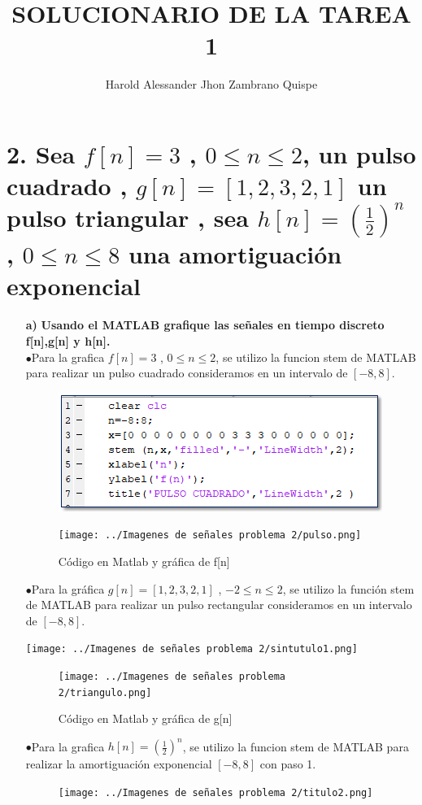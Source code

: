 \documentclass[11pt,a4paper]{article}
\author{Harold Alessander Jhon Zambrano Quispe}
\title{SOLUCIONARIO DE LA TAREA 1}
\begin{document}
   
	\section{{\large \textbf{2. Sea $f[n]=3$ , $0\leq n \leq 2$, un pulso cuadrado , $g[n]=[1,2,3,2,1]$ un pulso triangular , sea $h[n]=(\frac{1}{2})^n$ , $0\leq n\leq 8$ una amortiguación exponencial}}}{
	\large{
	\begin{enumerate}
	\item[\textbf{a)}]
	\textbf{Usando el MATLAB grafique las señales en tiempo discreto f[n],g[n] y h[n].}\\
	$ \bullet$Para la grafica $f[n]=3$ , $ 0\leq n\leq 2$, se utilizo la funcion stem de MATLAB para realizar un pulso cuadrado consideramos en un intervalo de $[-8,8]$.
\begin{figure}[h]
\centering
\includegraphics[scale=0.6]{../Imagenes de señales problema 2/Sin título.png} 
\end{figure}

\begin{figure}[h]
\centering
\texttt{[image: ../Imagenes de señales problema 2/pulso.png]} 
\caption{Código en Matlab y gráfica de f[n]} 
\label{Gráfica_fn}
\end{figure}
$\bullet$Para la gráfica $g[n]=[1,2,3,2,1]$ , $-2\leq n\leq 2$, se utilizo la función stem de MATLAB para realizar un pulso rectangular consideramos en un intervalo de $[-8,8]$.

\begin{center}
\texttt{[image: ../Imagenes de señales problema 2/sintutulo1.png]}
\end{center}

\begin{figure}[h]
\centering
\texttt{[image: ../Imagenes de señales problema 2/triangulo.png]} 
\caption{Código en Matlab y gráfica de g[n]} 
\label{Gráfica_gn}
\end{figure}
\newpage
$\bullet$Para la grafica $h[n]=(\frac{1}{2})^n$, se utilizo la funcion stem de MATLAB para realizar la amortiguación exponencial $[-8,8]$ con paso 1.
\begin{figure}[h]
\centering
\texttt{[image: ../Imagenes de señales problema 2/titulo2.png]} 
\label{Código_hn}
\end{figure}


\end{enumerate}}}
\end{document}
